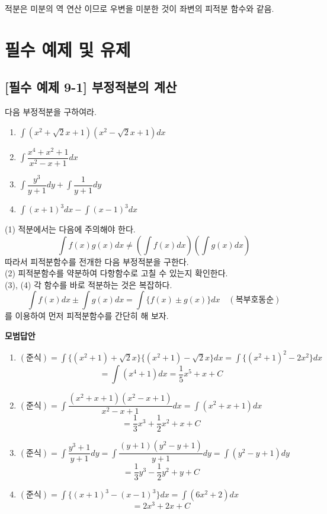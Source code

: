 \documentclass[a4paper,11pt]{article}
\begin{document}
적분은 미분의 역 연산 이므로 우변을 미분한 것이  좌변의 피적분 함수와 같음.
\newpage

\section{필수 예제 및 유제}

\subsection*{[필수 예제 9-1] 부정적분의 계산}
다음 부정적분을 구하여라.
\begin{enumerate}
    \item $\int (x^2+\sqrt{2}x+1)(x^2-\sqrt{2}x+1) dx$
    \item $\int \dfrac{x^4+x^2+1}{x^2-x+1} dx$
    \item $\int \dfrac{y^3}{y+1} dy + \int \dfrac{1}{y+1} dy$
    \item $\int (x+1)^3 dx - \int (x-1)^3 dx$
\end{enumerate}

\begin{studybox}
(1) 적분에서는 다음에 주의해야 한다.
\[ \int f(x)g(x)dx \ne \left( \int f(x)dx \right) \left( \int g(x)dx \right) \]
따라서 피적분함수를 전개한 다음 부정적분을 구한다.\\
(2) 피적분함수를 약분하여 다항함수로 고칠 수 있는지 확인한다. \\
(3), (4) 각 함수를 바로 적분하는 것은 복잡하다.
\[ \int f(x)dx \pm \int g(x)dx = \int \{ f(x) \pm g(x) \} dx \quad (\text{복부호동순}) \]
를 이용하여 먼저 피적분함수를 간단히 해 보자.
\end{studybox}

\textbf{모범답안}
\begin{enumerate}
    \item $(\text{준식}) = \int \{ (x^2+1)+\sqrt{2}x \} \{ (x^2+1)-\sqrt{2}x \} dx = \int \{ (x^2+1)^2 - 2x^2 \} dx$
    \[ = \int (x^4+1) dx = \dfrac{1}{5}x^5 + x + C \]
    \item $(\text{준식}) = \int \dfrac{(x^2+x+1)(x^2-x+1)}{x^2-x+1} dx = \int (x^2+x+1) dx$
    \[ = \dfrac{1}{3}x^3 + \dfrac{1}{2}x^2 + x + C \]
    \item $(\text{준식}) = \int \dfrac{y^3+1}{y+1} dy = \int \dfrac{(y+1)(y^2-y+1)}{y+1} dy = \int (y^2-y+1) dy$
    \[ = \dfrac{1}{3}y^3 - \dfrac{1}{2}y^2 + y + C \]
    \item $(\text{준식}) = \int \{ (x+1)^3 - (x-1)^3 \} dx = \int (6x^2+2) dx$
    \[ = 2x^3 + 2x + C \]
\end{enumerate}
\end{document}
